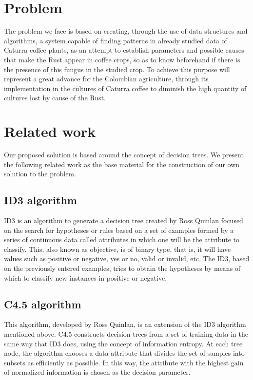 \documentclass{acm_proc_article-sp}
\begin{document}
\section{Problem}
The problem we face is based on creating, through the use of data structures and algorithms, a system capable of finding patterns in already studied data of Caturra coffee plants, as an attempt to establish parameters and possible causes that make the Rust appear in coffee crops, so as to know beforehand if there is the presence of this fungus in the studied crop.
To achieve this purpose will represent a great advance for the Colombian agriculture, through its implementation in the cultures of Caturra coffee to diminish the high quantity of cultures lost by cause of the Rust.

\section{Related work}
Our proposed solution is based around the concept of decision trees. We present the following related work as the base material for the construction of our own solution to the problem.

\subsection{ID3 algorithm}
ID3 is an algorithm to generate a decision tree created by Ross Quinlan focused on the search for hypotheses or rules based on a set of examples formed by a series of continuous data called attributes in which one will be the attribute to classify. This, also known as objective, is of binary type, that is, it will have values such as positive or negative, yes or no, valid or invalid, etc.
The ID3, based on the previously entered examples, tries to obtain the hypotheses by means of which to classify new instances in positive or negative.

\subsection{C4.5 algorithm}
This algorithm, developed by Ross Quinlan, is an extension of the ID3 algorithm mentioned above. C4.5 constructs decision trees from a set of training data in the same way that ID3 does, using the concept of information entropy. At each tree node, the algorithm chooses a data attribute that divides the set of samples into subsets as efficiently as possible. In this way, the attribute with the highest gain of normalized information is chosen as the decision parameter.
\end{document}
